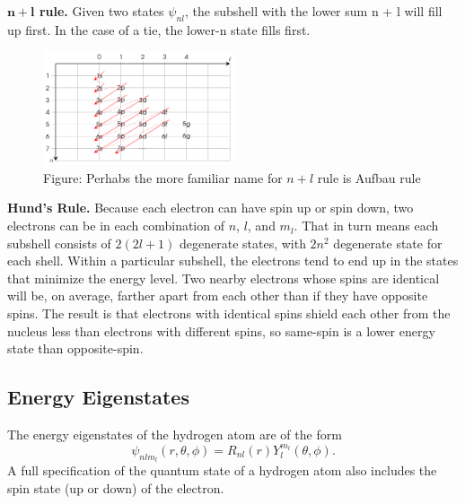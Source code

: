 \documentclass[../main.tex]{subfiles}
\begin{document}
\textbf{$\boldsymbol{n + l}$ rule.} Given two states $\psi_{nl}$, the subshell with the lower sum n + l will fill up first. In the case of a tie, the lower-n state fills first.
\begin{figure}
    \centering
    \includegraphics[width=0.5\textwidth]{../Rss/HA/Aufbau.png}
    \caption*{Figure: Perhabs the more familiar name for $n+l$ rule is Aufbau rule}
\end{figure}

\textbf{Hund's Rule.} Because each electron can have spin up or spin down, two electrons can be in each
combination of $n$, $l$, and $m_l$. That in turn means each subshell consists of $2(2l + 1)$ degenerate states, with $2n^2$ degenerate state for each shell. Within a particular subshell, the electrons tend to end up in the states that minimize the energy level. Two nearby electrons whose spins are identical will be, on average, farther apart from each other than if they have opposite spins. The result is that electrons with identical spins shield each other from the nucleus less than electrons with different spins, so same-spin is a lower energy state than opposite-spin.

\subsection*{Energy Eigenstates}
The energy eigenstates of the hydrogen atom are of the form
\begin{equation*}
    \psi_{nlm_l} (r,\theta,\phi) = R_{nl}(r)Y^{m_l}_l (\theta,\phi).
\end{equation*}
A full specification of the quantum state of a hydrogen atom also includes the spin state (up or down) of the electron.
\end{document}
